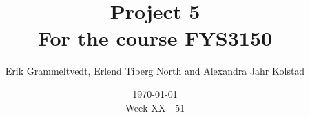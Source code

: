 \documentclass{article}
\begin{document}
\addtocounter{page}{0}

\title{Project 5 \\
      \large For the course FYS3150}
\date{\today \\
    \vspace{1mm}
    \large Week XX - 51}

\author{Erik Grammeltvedt, Erlend Tiberg North and Alexandra Jahr Kolstad}

\maketitle




\end{document}
